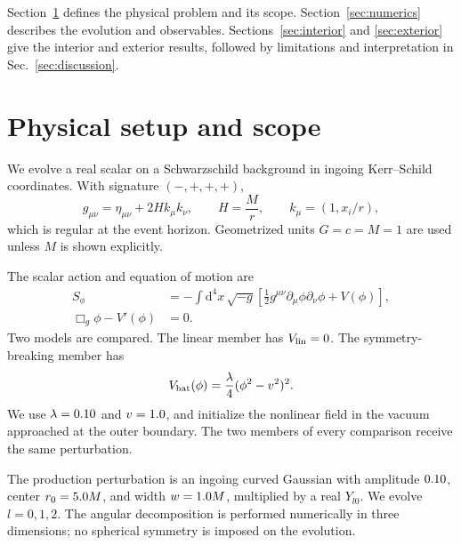 \documentclass[
  aps,
  prd,
  reprint,
  superscriptaddress,
  nofootinbib,
  longbibliography
]{revtex4-2}
\newcommand{\dd}{\mathrm{d}}
\begin{document}
Section~\ref{sec:setup} defines the physical problem and its scope.
Section~\ref{sec:numerics} describes the evolution and observables.
Sections~\ref{sec:interior} and \ref{sec:exterior} give the interior and
exterior results, followed by limitations and interpretation in
Sec.~\ref{sec:discussion}.

\section{Physical setup and scope}
\label{sec:setup}

We evolve a real scalar on a Schwarzschild background in ingoing
Kerr--Schild coordinates.  With signature $(-,+,+,+)$,
\begin{equation}
  g_{\mu\nu}=\eta_{\mu\nu}+2H k_\mu k_\nu,
  \qquad H=\frac{M}{r},
  \qquad k_\mu=(1,x_i/r),
  \label{eq:ks-metric}
\end{equation}
which is regular at the event horizon.  Geometrized units $G=c=M=1$ are
used unless $M$ is shown explicitly.

The scalar action and equation of motion are
\begin{align}
  S_\phi
  &= -\int \dd^4x\,\sqrt{-g}
     \left[\frac12 g^{\mu\nu}\partial_\mu\phi\partial_\nu\phi
     +V(\phi)\right], \\
  \Box_g\phi-V'(\phi)&=0.
  \label{eq:kg}
\end{align}
Two models are compared.  The linear member has $V_{\rm lin}=0$.  The
symmetry-breaking member has
\begin{equation}
  V_{\rm hat}(\phi)=\frac{\lambda}{4}(\phi^2-v^2)^2 .
  \label{eq:mexhat}
\end{equation}
We use $\lambda=0.10$ and $v=1.0$, and initialize the
nonlinear field in the vacuum approached at the outer boundary.  The two
members of every comparison receive the same perturbation.

The production perturbation is an ingoing curved Gaussian with amplitude
$0.10$, center $r_0=5.0 M$, and width
$w=1.0 M$, multiplied by a real $Y_{l0}$.  We evolve $l=0,1,2$.
The angular decomposition is performed numerically in three dimensions; no
spherical symmetry is imposed on the evolution.
\end{document}
